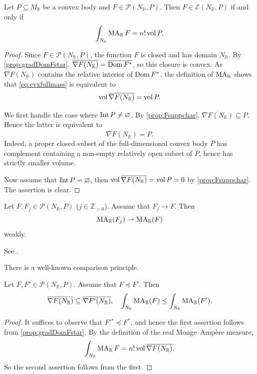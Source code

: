 \begin{proposition}\label{prop:convex:L541}
    Let $P\subseteq M_{\mathbb{R}}$ be a convex body and $F\in \mathcal{P}(N_{\mathbb{R}},P)$. Then $F\in \mathcal{E}(N_{\mathbb{R}},P)$ if and only if
    \begin{equation}\label{eq:cvxfullmass}
    \int_{N_{\mathbb{R}}}\operatorname{MA}_{\mathbb{R}}F=n! \operatorname{vol} P.
    \end{equation}
\end{proposition}
\begin{proof}


   Since $F\in\mathcal{P}(N_{\mathbb{R}},P)$, the function $F$ is closed and has domain $N_{\mathbb{R}}$. By \cref{prop:gradDomFstar}, $\overline{\nabla F(N_{\mathbb{R}})}=\overline{\operatorname{Dom} F^*}$, so this closure is convex. As $\nabla F(N_{\mathbb{R}})$ contains the relative interior of $\operatorname{Dom} F^*$, the definition of $\operatorname{MA}_{\mathbb{R}}$ shows that \eqref{eq:cvxfullmass} is equivalent to
   \[
   \operatorname{vol} \overline{\nabla F(N_{\mathbb{R}})}=\operatorname{vol} P.
   \]

   We first handle the case where $\operatorname{Int} P\neq \varnothing$.
   By \cref{prop:Fsuppchar}, $\overline{\nabla F(N_{\mathbb{R}})}\subseteq P$. Hence the latter is equivalent to
   \[
   \overline{\nabla F(N_{\mathbb{R}})}=P.
   \]
   Indeed, a proper closed subset of the full-dimensional convex body $P$ has complement containing a non-empty relatively open subset of $P$, hence has strictly smaller volume.

   Now assume that $\operatorname{Int} P=\varnothing$, then $\operatorname{vol} \overline{\nabla F(N_{\mathbb{R}})}=\operatorname{vol} P=0$ by \cref{prop:Fsuppchar}. The assertion is clear.
\end{proof}


\begin{theorem}\label{thm:realMAcont}
    Let $F,F_j\in \mathcal{P}(N_{\mathbb{R}},P)$ ($j\in \mathbb{Z}_{>0}$). Assume that $F_j\to F$. Then
    \[
    \operatorname{MA}_{\mathbb{R}}(F_j)\rightharpoonup \operatorname{MA}_{\mathbb{R}}(F)
    \]
    weakly.
\end{theorem}
See \cite[Proposition~2.6]{Fig17}.

There is a well-known comparison principle.
\begin{theorem}\label{thm:convcomp}
    Let $F,F'\in \mathcal{P}(N_{\mathbb{R}},P)$. Assume that $F\preceq F'$. Then
    \[
    \overline{\nabla F(N_{\mathbb{R}})}\subseteq \overline{\nabla F'(N_{\mathbb{R}})},\quad
    \int_{N_{\mathbb{R}}} \operatorname{MA}_{\mathbb{R}}(F)\leq \int_{N_{\mathbb{R}}} \operatorname{MA}_{\mathbb{R}}(F').
    \]
\end{theorem}
\begin{proof}
    It suffices to observe that $F'{}^*\preceq F^*$, and hence the first assertion follows from \cref{prop:gradDomFstar}. By the definition of the real Monge--Ampère measure,
    \[
        \int_{N_{\mathbb R}}\operatorname{MA}_{\mathbb R}F=n!\operatorname{vol}\overline{\nabla F(N_{\mathbb R})}.
    \]
    So the second assertion follows from the first.
\end{proof}


